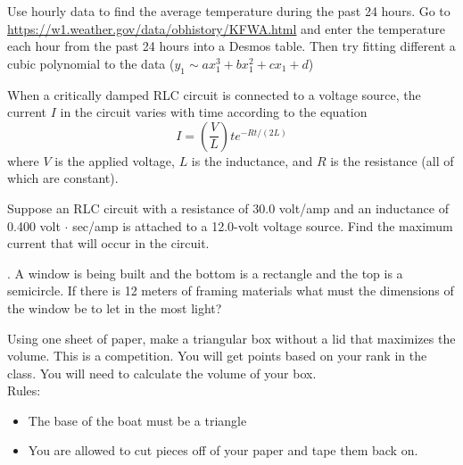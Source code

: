 \documentclass[11pt]{exam}
\begin{document}
	\begin{questions}
		
		\addpoints
		
		\question[15]
		Use hourly data to find the average temperature during the past 24 hours.
		Go to \url{https://w1.weather.gov/data/obhistory/KFWA.html} and enter the temperature each hour from the past 24 hours into a Desmos table.  Then try fitting different a cubic polynomial to the data ($y_1 \sim ax_1^3 + bx_1^2 + cx_1 + d$)
		
		\question[5]
		When a critically damped RLC circuit is connected to a voltage source, the current $I$ in the circuit varies with time according to the equation
		\[I = \left(\frac{V}{L}\right)te^{-Rt/(2L)}\]
		where $V$ is the applied voltage, $L$ is the inductance, and $R$ is the resistance (all of which are constant).
		
		Suppose an RLC circuit with a resistance of 30.0 volt/amp and an inductance of 0.400 volt $\cdot$ sec/amp is attached to a 12.0-volt voltage source. Find the maximum current that will occur in the circuit.
			
		.	A window is being built and the bottom is a rectangle and the top is a semicircle. If there is 12 meters of framing materials what must the dimensions of the window be to let in the most light?
		
		\question[5] Using one sheet of paper, make a triangular box without a lid that maximizes the volume.  This is a competition.  You will get points based on your rank in the class.  You will need to calculate the volume of your box.\\
		
		Rules:
		\begin{itemize}
			\item The base of the boat must be a triangle
			\item You are allowed to cut pieces off of your paper and tape them back on.
		\end{itemize}
		
		
	\end{questions}
	
\end{document}
